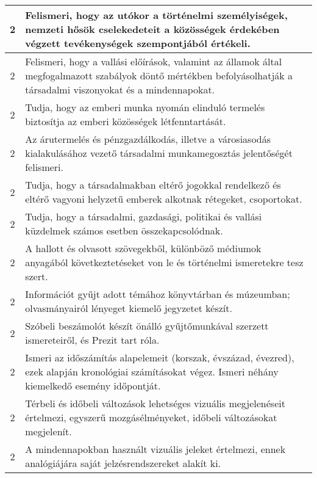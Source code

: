 \begin{longtable}{c | p{12cm} }
                                          2 &  Felismeri, hogy az utókor a történelmi személyiségek, nemzeti hősök cselekedeteit a közösségek érdekében végzett tevékenységek szempontjából értékeli. \\ \hline
                                          2 &  Felismeri, hogy a vallási előírások, valamint az államok által megfogalmazott szabályok döntő mértékben befolyásolhatják a társadalmi viszonyokat és a mindennapokat. \\ \hline
                                          2 &  Tudja, hogy az emberi munka nyomán elinduló termelés biztosítja az emberi közösségek létfenntartását. \\ \hline
                                          2 &  Az árutermelés és pénzgazdálkodás, illetve a városiasodás kialakulásához vezető társadalmi munkamegosztás jelentőségét felismeri. \\ \hline
                                          2 &  Tudja, hogy a társadalmakban eltérő jogokkal rendelkező és eltérő vagyoni helyzetű emberek alkotnak rétegeket, csoportokat. \\ \hline
                                          2 &  Tudja, hogy a társadalmi, gazdasági, politikai és vallási küzdelmek számos esetben összekapcsolódnak. \\ \hline
                                          2 &  A hallott és olvasott szövegekből, különböző médiumok anyagából következtetéseket von le és történelmi ismeretekre tesz szert. \\ \hline
                                          2 &  Információt gyűjt adott témához könyvtárban és múzeumban; olvasmányairól lényeget kiemelő jegyzetet készít. \\ \hline
                                          2 &  Szóbeli beszámolót készít önálló gyűjtőmunkával szerzett ismereteiről, és Prezit tart róla. \\ \hline
                                          2 &  Ismeri az időszámítás alapelemeit (korszak, évszázad, évezred), ezek alapján kronológiai számításokat végez. Ismeri néhány kiemelkedő esemény időpontját. \\ \hline
                                          2 &  Térbeli és időbeli változások lehetséges vizuális megjelenéseit értelmezi, egyszerű mozgásélményeket, időbeli változásokat megjelenít. \\ \hline
                                          2 &  A mindennapokban használt vizuális jeleket értelmezi, ennek analógiájára saját jelzésrendszereket alakít ki. \\ \hline

\end{longtable}
